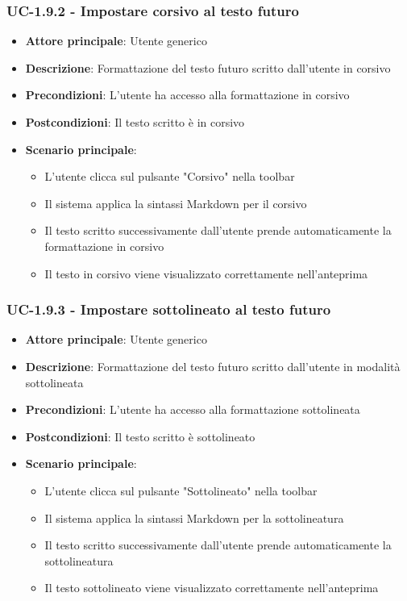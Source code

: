 \documentclass[11pt,a4paper]{article}
\begin{document}
\subsubsection{UC-1.9.2 - Impostare corsivo al testo futuro}
\begin{itemize}
    \item \textbf{Attore principale}: Utente generico
    \item \textbf{Descrizione}: Formattazione del testo futuro scritto dall’utente in corsivo
    \item \textbf{Precondizioni}: L’utente ha accesso alla formattazione in corsivo
    \item \textbf{Postcondizioni}: Il testo scritto è in corsivo
    \item \textbf{Scenario principale}:
        \begin{itemize}
            \item L’utente clicca sul pulsante "Corsivo" nella toolbar
            \item Il sistema applica la sintassi Markdown per il corsivo
            \item Il testo scritto successivamente dall'utente prende automaticamente la formattazione in corsivo
            \item Il testo in corsivo viene visualizzato correttamente nell'anteprima
        \end{itemize}
\end{itemize}

\subsubsection{UC-1.9.3 - Impostare sottolineato al testo futuro}
\begin{itemize}
    \item \textbf{Attore principale}: Utente generico
    \item \textbf{Descrizione}: Formattazione del testo futuro scritto dall’utente in modalità sottolineata

    \item \textbf{Precondizioni}: L’utente ha accesso alla formattazione sottolineata
    \item \textbf{Postcondizioni}: Il testo scritto è sottolineato
    \item \textbf{Scenario principale}:
        \begin{itemize}
            \item L’utente clicca sul pulsante "Sottolineato" nella toolbar
            \item Il sistema applica la sintassi Markdown per la sottolineatura
            \item Il testo scritto successivamente dall'utente prende automaticamente la sottolineatura
            \item Il testo sottolineato viene visualizzato correttamente nell'anteprima
        \end{itemize}
\end{itemize}
\end{document}
